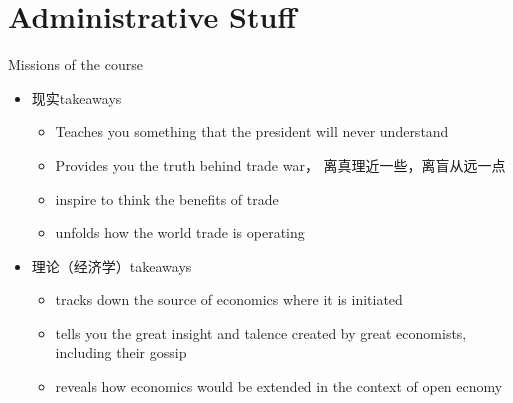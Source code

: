 \documentclass[10pt,hyperref={CJKbookmarks=true},xcolor=dvipsnames,aspectratio=43]{beamer}
\begin{document}
\section{Administrative Stuff}
\begin{frame}{Missions of the course}

\begin{itemize}
\item 现实takeaways
\begin{itemize}


\item Teaches you something that the president will never understand
\item Provides you the truth behind trade war， 离真理近一些，离盲从远一点

\item inspire to think the benefits of trade
\item unfolds how the world trade is operating
\end{itemize}
\item 理论（经济学）takeaways
\begin{itemize}

\item tracks down the source of economics where it is initiated
\item tells you the great insight and talence created by great economists,
including their gossip
\item reveals how economics would be extended in the context of open ecnomy
\end{itemize}

\end{itemize}
\end{frame}
\end{document}
